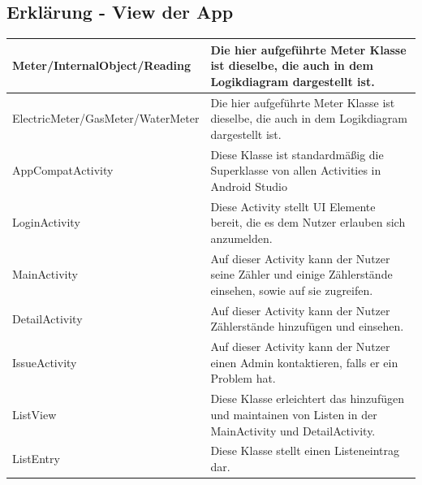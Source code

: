 \newpage

\subsection*{Erklärung - View der App}
\begin{tabularx}{15cm}{XX}
	\hline
	Meter/InternalObject/Reading & Die hier aufgeführte Meter Klasse ist dieselbe, die auch in dem Logikdiagram dargestellt ist. \\ \hline
	ElectricMeter/GasMeter/WaterMeter & Die hier aufgeführte Meter Klasse ist dieselbe, die auch in dem Logikdiagram dargestellt ist. \\ \hline
	AppCompatActivity & Diese Klasse ist standardmäßig die Superklasse von allen Activities in Android Studio \\ \hline
	LoginActivity & Diese Activity stellt UI Elemente bereit, die es dem Nutzer erlauben sich anzumelden. \\ \hline
	MainActivity & Auf dieser Activity kann der Nutzer seine Zähler und einige Zählerstände einsehen, sowie auf sie zugreifen. \\ \hline
	DetailActivity & Auf dieser Activity kann der Nutzer Zählerstände hinzufügen und einsehen. \\ \hline
	IssueActivity & Auf dieser Activity kann der Nutzer einen Admin kontaktieren, falls er ein Problem hat. \\ \hline
	ListView & Diese Klasse erleichtert das hinzufügen und maintainen von Listen in der MainActivity und DetailActivity. \\ \hline
	ListEntry & Diese Klasse stellt einen Listeneintrag dar. 
\end{tabularx}